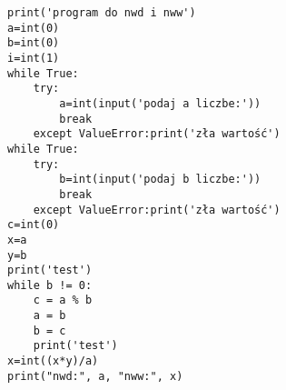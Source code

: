 \begin{verbatim}
print('program do nwd i nww')
a=int(0)
b=int(0)
i=int(1)
while True:
    try:
        a=int(input('podaj a liczbe:'))
        break   
    except ValueError:print('zła wartość')
while True:
    try:
        b=int(input('podaj b liczbe:'))
        break   
    except ValueError:print('zła wartość')    
c=int(0)
x=a
y=b
print('test')
while b != 0:
    c = a % b
    a = b
    b = c
    print('test')
x=int((x*y)/a)
print("nwd:", a, "nww:", x)
\end{verbatim}